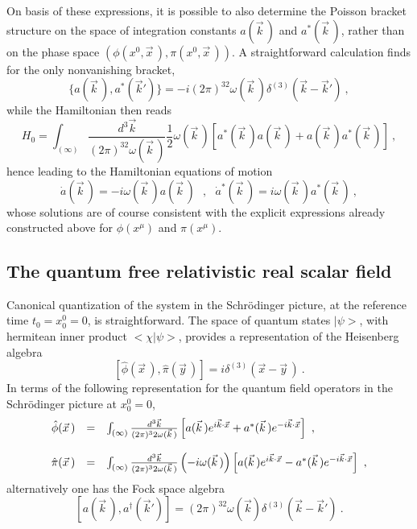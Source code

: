 \documentclass[a4paper,11pt]{article}
\begin{document}
On basis of these expressions, it is possible to also determine the Poisson
bracket structure on the space of integration constants $a(\vec{k}\,)$
and $a^*(\vec{k}\,)$, rather than on the phase space 
$(\phi(x^0,\vec{x}\,),\pi(x^0,\vec{x}\,))$. A straightforward
calculation finds for the only nonvanishing bracket,
\begin{equation}
\{a(\vec{k}\,),a^*(\vec{k}')\}=-i(2\pi)^32\omega(\vec{k}\,)
\delta^{(3)}\left(\vec{k}-\vec{k}'\right)\ ,
\end{equation}
while the Hamiltonian then reads
\begin{equation}
H_0=\int_{(\infty)}\frac{d^3\vec{k}}{(2\pi)^32\omega(\vec{k}\,)}
\frac{1}{2}\omega(\vec{k}\,)\left[a^*(\vec{k}\,)a(\vec{k}\,)+
a(\vec{k}\,)a^*(\vec{k}\,)\right]\ ,
\end{equation}
hence leading to the Hamiltonian equations of motion
\begin{equation}
\dot{a}(\vec{k}\,)=-i\omega(\vec{k}\,)a(\vec{k}\,)\ \ \ ,\ \ \ 
\dot{a}^*(\vec{k}\,)=i\omega(\vec{k}\,)a^*(\vec{k}\,)\ ,
\end{equation}
whose solutions are of course consistent with the explicit expressions
already constructed above for $\phi(x^\mu)$ and $\pi(x^\mu)$.

\subsection{The quantum free relativistic real scalar field}
\label{Subsect3.3}

Canonical quantization of the system in the Schr\"odinger picture,
at the re\-fe\-rence time $t_0=x^0_0=0$, is straightforward. The space
of quantum states $|\psi>$, with hermitean inner product
$<\chi|\psi>$, provides a representation of the Heisenberg
algebra
\begin{equation}
\left[\hat{\phi}(\vec{x}\,),\hat{\pi}(\vec{y}\,)\right]=
i\delta^{(3)}\left(\vec{x}-\vec{y}\,\right)\ .
\label{eq:Heisenbergfield}
\end{equation}
In terms of the following representation for the quantum field
operators in the Schr\"odinger picture at $x^0_0=0$,
\begin{equation}
\begin{array}{r c l}
\hat{\phi}(\vec{x}\,)&=&
\int_{(\infty)}\frac{d^3\vec{k}}{(2\pi)^32\omega(\vec{k}\,)}
\left[a(\vec{k}\,)e^{i\vec{k}\cdot\vec{x}}+
a^*(\vec{k}\,)e^{-i\vec{k}\cdot\vec{x}}\right]\ ,\\
 & & \\
\hat{\pi}(\vec{x}\,)&=&
\int_{(\infty)}\frac{d^3\vec{k}}{(2\pi)^32\omega(\vec{k}\,)}
\left(-i\omega(\vec{k}\,)\right)
\left[a(\vec{k}\,)e^{i\vec{k}\cdot\vec{x}}-
a^*(\vec{k}\,)e^{-i\vec{k}\cdot\vec{x}}\right]\ ,
\end{array}
\end{equation}
alternatively one has the Fock space algebra
\begin{equation}
\left[a(\vec{k}\,),a^\dagger(\vec{k}')\right]=(2\pi)^32\omega(\vec{k})
\delta^{(3)}\left(\vec{k}-\vec{k}'\right)\ .
\label{eq:Fockfield}
\end{equation}
\end{document}
